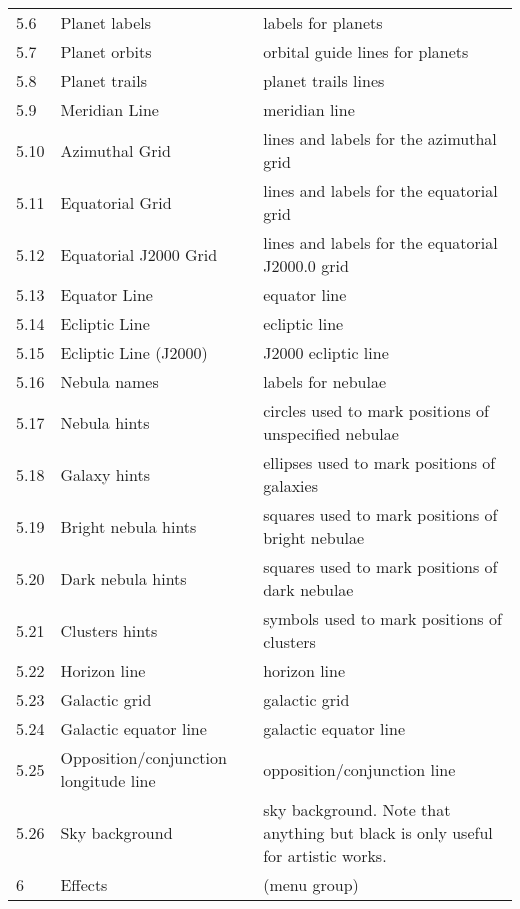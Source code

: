\begin{longtable}{l|p{45mm}|p{85mm}}
5.6  & Planet labels               & labels for planets\\%
5.7  & Planet orbits               & orbital guide lines for planets\\%
5.8  & Planet trails               & planet trails lines\\%
5.9  & Meridian Line               & meridian line\\%
5.10 & Azimuthal Grid              & lines and labels for the azimuthal grid\\%
5.11 & Equatorial Grid             & lines and labels for the equatorial grid\\%
5.12 & Equatorial J2000 Grid       & lines and labels for the equatorial J2000.0 grid\\%
5.13 & Equator Line                & equator line\\%
5.14 & Ecliptic Line               & ecliptic line\\%
5.15 & Ecliptic Line (J2000)       & J2000 ecliptic line\\%
5.16 & Nebula names                & labels for nebulae\\%
5.17 & Nebula hints                & circles  used to mark positions of unspecified nebulae\\%
5.18 & Galaxy hints                & ellipses used to mark positions of galaxies\\%
5.19 & Bright nebula hints         & squares  used to mark positions of bright nebulae\\%
5.20 & Dark nebula hints           & squares  used to mark positions of dark nebulae\\%
5.21 & Clusters hints              & symbols  used to mark positions of clusters\\%
5.22 & Horizon line                & horizon line\\%
5.23 & Galactic grid               & galactic grid\\%
5.24 & Galactic equator line       & galactic equator line\\%
5.25 & Opposition/conjunction longitude line  & opposition/conjunction line\\
5.26 & Sky background              & sky background. Note that anything but black is only useful for artistic works.\\\midrule
6    & Effects & (menu group)\\%

\end{longtable}
